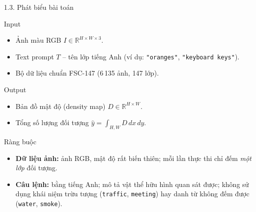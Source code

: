 \documentclass[11pt]{beamer}
\begin{document}
\begin{frame}{1.3. Phát biểu bài toán}
\scriptsize

\begin{block}{Input}
\begin{itemize}
    \item Ảnh màu RGB $I \in \mathbb{R}^{H \times W \times 3}$.
    \item Text prompt $T$ -- tên lớp tiếng Anh (ví dụ: \texttt{"oranges"}, \texttt{"keyboard keys"}).
    \item Bộ dữ liệu chuẩn FSC-147 (6\,135 ảnh, 147 lớp).
\end{itemize}
\end{block}

\begin{block}{Output}
\begin{itemize}
    \item Bản đồ mật độ (density map) $D \in \mathbb{R}^{H \times W}$.
    \item Tổng số lượng đối tượng $\hat{y} = \int_{H,W} D \, dx\, dy$.
\end{itemize}
\end{block}

\begin{block}{Ràng buộc}
\begin{itemize}
    \item \textbf{Dữ liệu ảnh:} ảnh RGB, mật độ rất biến thiên; mỗi lần thực thi chỉ đếm \emph{một lớp} đối tượng.
    \item \textbf{Câu lệnh:} bằng tiếng Anh; mô tả vật thể hữu hình quan sát được; không sử dụng khái niệm trừu tượng (\texttt{traffic}, \texttt{meeting}) hay danh từ không đếm được (\texttt{water}, \texttt{smoke}).
\end{itemize}
\end{block}

\vspace{0.3em}
\centering
{}
    \end{frame}
\end{document}
